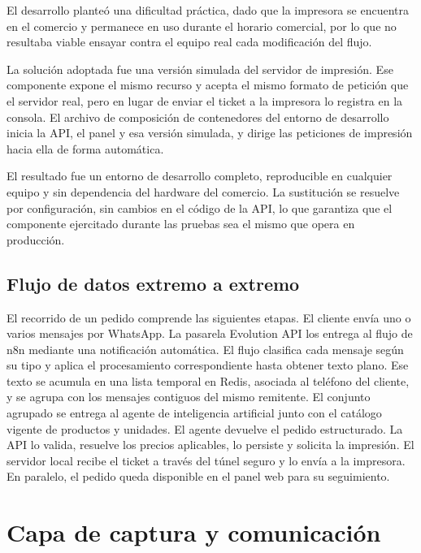 El desarrollo planteó una dificultad práctica, dado que la impresora se encuentra en el comercio y permanece en uso durante el horario comercial, por lo que no resultaba viable ensayar contra el equipo real cada modificación del flujo.

La solución adoptada fue una versión simulada del servidor de impresión. Ese componente expone el mismo recurso y acepta el mismo formato de petición que el servidor real, pero en lugar de enviar el ticket a la impresora lo registra en la consola. El archivo de composición de contenedores del entorno de desarrollo inicia la API, el panel y esa versión simulada, y dirige las peticiones de impresión hacia ella de forma automática.

El resultado fue un entorno de desarrollo completo, reproducible en cualquier equipo y sin dependencia del hardware del comercio. La sustitución se resuelve por configuración, sin cambios en el código de la API, lo que garantiza que el componente ejercitado durante las pruebas sea el mismo que opera en producción.

\subsection{Flujo de datos extremo a extremo}
\label{subsec:flujo_extremo}

El recorrido de un pedido comprende las siguientes etapas. El cliente envía uno o varios mensajes por WhatsApp. La pasarela Evolution API los entrega al flujo de n8n mediante una notificación automática. El flujo clasifica cada mensaje según su tipo y aplica el procesamiento correspondiente hasta obtener texto plano. Ese texto se acumula en una lista temporal en Redis, asociada al teléfono del cliente, y se agrupa con los mensajes contiguos del mismo remitente. El conjunto agrupado se entrega al agente de inteligencia artificial junto con el catálogo vigente de productos y unidades. El agente devuelve el pedido estructurado. La API lo valida, resuelve los precios aplicables, lo persiste y solicita la impresión. El servidor local recibe el ticket a través del túnel seguro y lo envía a la impresora. En paralelo, el pedido queda disponible en el panel web para su seguimiento.


\section{Capa de captura y comunicación}
\label{sec:capa_captura}

